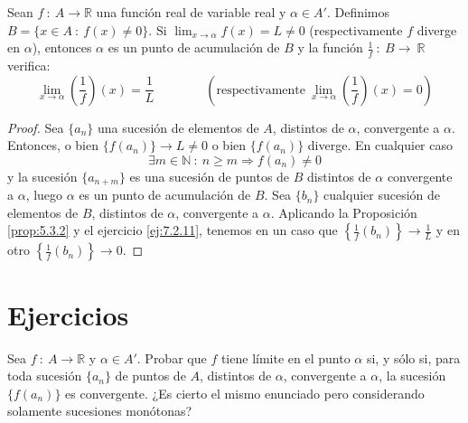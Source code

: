 \begin{prop}
    Sean $f ~:~ A \longrightarrow \mathbb{R}$ una función real de variable real y $\alpha \in A'$.
    Definimos $B = \{x \in A ~:~ f(x) \neq 0\}$. Si $\displaystyle\lim_{x \to \alpha} f(x) = L \neq 0$ (respectivamente $f$ diverge en $\alpha$), entonces $\alpha$ es un punto de acumulación de $B$ y la función $\frac{1}{f} ~:~ B \longrightarrow ~\mathbb{R}$ verifica:
    \begin{equation*}
        \displaystyle\lim_{x \to \alpha} \left(\frac{1}{f}\right)(x) = \frac{1}{L}
        \qquad \qquad
        (\text{respectivamente} ~ \displaystyle\lim_{x \to \alpha} \left(\frac{1}{f}\right)(x) = 0)
    \end{equation*}
\end{prop}
\begin{proof}
    Sea $\{a_n\}$ una sucesión de elementos de $A$, distintos de $\alpha$, convergente a $\alpha$. Entonces, o bien $\{f(a_n)\} \longrightarrow L \neq 0$ o bien $\{f(a_n)\}$ diverge. En cualquier caso
    \begin{equation*}
        \exists m \in \mathbb{N} ~:~ n \geq m \Longrightarrow f(a_n) \neq 0
    \end{equation*}
    y la sucesión $\{a_{n+m}\}$ es una sucesión de puntos de $B$ distintos de $\alpha$ convergente a $\alpha$, luego $\alpha$ es un punto de acumulación de $B$. Sea $\{b_n\}$ cualquier sucesión de elementos de $B$, distintos de $\alpha$, convergente a $\alpha$. Aplicando la Proposición \ref{prop:5.3.2} y el ejercicio \ref{ej:7.2.11}, tenemos en un caso que $\left\{ \frac{1}{f}(b_n)\right\} \longrightarrow \frac{1}{L}$ y en otro $\left\{ \frac{1}{f}(b_n)\right\} \longrightarrow 0$.
\end{proof}


\section{Ejercicios}
\begin{ejercicio}
    Sea $f ~:~ A \longrightarrow \mathbb{R}$ y $\alpha \in A'$. Probar que $f$ tiene límite en el punto $\alpha$ si, y sólo si, para toda sucesión $\{a_n\}$ de puntos de $A$, distintos de $\alpha$, convergente a $\alpha$, la sucesión $\{f(a_n)\}$ es convergente. ¿Es cierto el mismo enunciado pero considerando solamente sucesiones monótonas?
\end{ejercicio}

